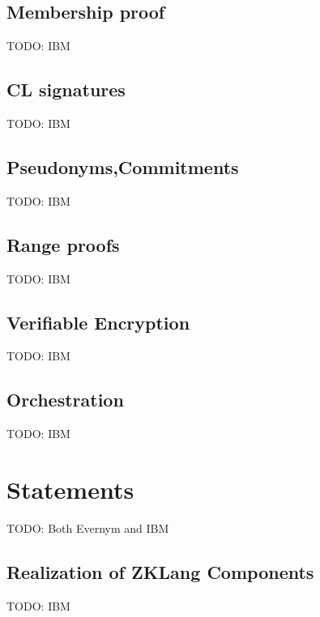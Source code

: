 \documentclass[a4paper]{article}
\begin{document}
\subsection{Membership proof}
TODO: IBM

\subsection{CL signatures}
TODO: IBM

\subsection{Pseudonyms,Commitments}
TODO: IBM

\subsection{Range proofs}
TODO: IBM

\subsection{Verifiable Encryption}
TODO: IBM

\subsection{Orchestration}
TODO: IBM

\section{Statements}
TODO: Both Evernym and IBM



\subsection{Realization of ZKLang Components}
TODO: IBM
\end{document}
